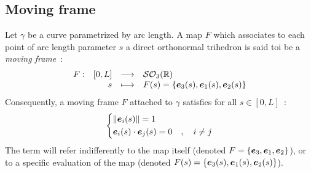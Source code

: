\subsection{Moving frame}

Let $\gamma$ be a curve parametrized by arc length. A map $F$ which associates to each point of arc length parameter $s$ a direct orthonormal trihedron is said toi be a \emph{moving frame}~:
\begin{equation}
	\begin{array}{lrcl} F: & [0,L] & \longrightarrow & \mathcal{SO}_{3}(\mathbb{R}) \\ & s & \longmapsto & F(s) = \{\boldsymbol{e}_{3}(s),\boldsymbol{e}_{1}(s),\boldsymbol{e}_{2}(s)\} \end{array}
\end{equation}
Consequently, a moving frame $F$ attached to $\gamma$ satisfies for all $s \in [0,L]$~:
\begin{equation}
	\left\{
	\begin{aligned}
		& \lVert\boldsymbol{e}_i(s)\rVert = 1 \\
		& \boldsymbol{e}_i(s) \cdot \boldsymbol{e}_j(s) = 0\quad , \quad i \neq j
	\end{aligned}
	\right.
\end{equation}
The term  will refer indifferently to the map itself (denoted $F=\{\boldsymbol{e}_{3},\boldsymbol{e}_{1},\boldsymbol{e}_{2}\}$), or to a specific evaluation of the map (denoted $F(s)=\{\boldsymbol{e}_{3}(s),\boldsymbol{e}_{1}(s),\boldsymbol{e}_{2}(s)\}$).

